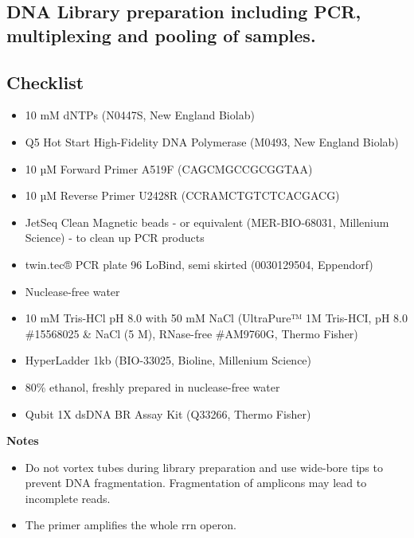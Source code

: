 \documentclass[
]{book}
\providecommand{\tightlist}{%
  \setlength{\itemsep}{0pt}\setlength{\parskip}{0pt}}
\begin{document}
\subsection{DNA Library preparation including PCR, multiplexing and pooling of samples.}\label{dna-library-preparation-including-pcr-multiplexing-and-pooling-of-samples.}

\subsection{Checklist}\label{checklist-1}

\begin{itemize}
\tightlist
\item
  10 mM dNTPs (N0447S, New England Biolab)
\item
  Q5 Hot Start High-Fidelity DNA Polymerase (M0493, New England Biolab)
\item
  10 µM Forward Primer A519F (CAGCMGCCGCGGTAA) \citep{Martijn2019}
\item
  10 µM Reverse Primer U2428R (CCRAMCTGTCTCACGACG) \citep{Martijn2019}
\item
  JetSeq Clean Magnetic beads - or equivalent (MER-BIO-68031, Millenium Science) - to clean up PCR products\\
\item
  twin.tec® PCR plate 96 LoBind, semi skirted (0030129504, Eppendorf)\\
\item
  Nuclease-free water
\item
  10 mM Tris-HCl pH 8.0 with 50 mM NaCl (UltraPure™ 1M Tris-HCI, pH 8.0 \#15568025 \& NaCl (5 M), RNase-free \#AM9760G, Thermo Fisher)\\
\item
  HyperLadder 1kb (BIO-33025, Bioline, Millenium Science)
\item
  80\% ethanol, freshly prepared in nuclease-free water
\item
  Qubit 1X dsDNA BR Assay Kit (Q33266, Thermo Fisher)
\end{itemize}

\textbf{Notes}

\begin{itemize}
\tightlist
\item
  Do not vortex tubes during library preparation and use wide-bore tips to prevent DNA fragmentation. Fragmentation of amplicons may lead to incomplete reads.\\
\item
  The primer amplifies the whole rrn operon.
\end{itemize}
\end{document}
